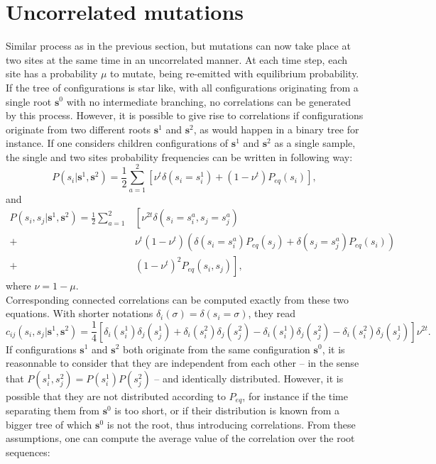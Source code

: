 \documentclass[10pt]{article}
\begin{document}
\section{Uncorrelated mutations} %
\label{sec:uncorrelated_mutations}

Similar process as in the previous section, but mutations can now take place at two sites at the same time in an uncorrelated manner. At each time step, each site has a probability $\mu$ to mutate, being re-emitted with equilibrium probability. \\
If the tree of configurations is star like, with all configurations originating from a single root $\mathbf{s}^0$ with no intermediate branching, no correlations can be generated by this process. However, it is possible to give rise to correlations if configurations originate from two different roots $\mathbf{s}^1$ and $\mathbf{s}^2$, as would happen in a binary tree for instance. If one considers children configurations of $\mathbf{s}^1$ and $\mathbf{s}^2$ as a single sample, the single and two sites probability frequencies can be written in following way:
\begin{equation}
	P(s_i\vert \mathbf{s}^1, \mathbf{s}^2) = \frac{1}{2}\sum_{a=1}^{2}\left[\nu^t\delta(s_i=s^1_i) + (1-\nu^t)P_{eq}(s_i)\right],
\end{equation}
and
\begin{equation}
	\begin{split}
		P(s_i,s_j\vert \mathbf{s}^1, \mathbf{s}^2) = \frac{1}{2}\sum_{a=1}^{2} &\left[\nu^{2t}\delta(s_i=s_i^a, s_j=s_j^a)\right. \\
		+ &\nu^t(1-\nu^t)\left(\delta(s_i=s_i^a)P_{eq}(s_j) + \delta(s_j=s_j^a)P_{eq}(s_i)\right)\\
		+ &\left.(1-\nu^t)^{2}P_{eq}(s_i,s_j)\right],
	\end{split}
\end{equation}
where $\nu=1-\mu$.\\
Corresponding connected correlations can be computed exactly from these two equations. With shorter notations $\delta_i(\sigma)=\delta(s_i=\sigma)$, they read
\begin{equation}
	c_{ij}(s_i,s_j\vert\mathbf{s}^1,\mathbf{s}^2) = \frac{1}{4}\left[\delta_i(s_i^1)\delta_j(s_j^1) + \delta_i(s_i^2)\delta_j(s_j^2) - \delta_i(s_i^1)\delta_j(s_j^2) - \delta_i(s_i^2)\delta_j(s_j^1)\right]\nu^{2t}.
\end{equation}
If configurations $\mathbf{s}^1$ and $\mathbf{s}^2$ both originate from the same configuration $\mathbf{s}^0$, it is reasonnable to consider that they are independent from each other -- in the sense that $P(s_i^1,s_j^2)=P(s_i^1)P(s_j^2)$ -- and identically distributed. However, it is possible that they are not distributed according to $P_{eq}$, for instance if the time separating them from $\mathbf{s}^0$ is too short, or if their distribution is known from a bigger tree of which $\mathbf{s}^0$ is not the root, thus introducing correlations. From these assumptions, one can compute the average value of the correlation over the root sequences:
\end{document}
